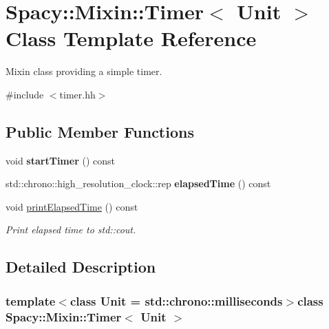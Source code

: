 \hypertarget{classSpacy_1_1Mixin_1_1Timer}{\section{\-Spacy\-:\-:\-Mixin\-:\-:\-Timer$<$ \-Unit $>$ \-Class \-Template \-Reference}
\label{classSpacy_1_1Mixin_1_1Timer}
}


\-Mixin class providing a simple timer.  




{\ttfamily \#include $<$timer.\-hh$>$}

\subsection*{\-Public \-Member \-Functions}
\begin{DoxyCompactItemize}
\item 
\hypertarget{classSpacy_1_1Mixin_1_1Timer_acf3c292b6d482c7c4ded5f961be4bc4b}{void {\bfseries start\-Timer} () const }\label{classSpacy_1_1Mixin_1_1Timer_acf3c292b6d482c7c4ded5f961be4bc4b}

\item 
\hypertarget{classSpacy_1_1Mixin_1_1Timer_ab27a20d8e1e9bc90ea56cb18ff752798}{std\-::chrono\-::high\-\_\-resolution\-\_\-clock\-::rep {\bfseries elapsed\-Time} () const }\label{classSpacy_1_1Mixin_1_1Timer_ab27a20d8e1e9bc90ea56cb18ff752798}

\item 
\hypertarget{classSpacy_1_1Mixin_1_1Timer_a3b79b35213702118d0823f6040d5a315}{void \hyperlink{classSpacy_1_1Mixin_1_1Timer_a3b79b35213702118d0823f6040d5a315}{print\-Elapsed\-Time} () const }\label{classSpacy_1_1Mixin_1_1Timer_a3b79b35213702118d0823f6040d5a315}

\begin{DoxyCompactList}\small\item\em \-Print elapsed time to std\-::cout. \end{DoxyCompactList}\end{DoxyCompactItemize}


\subsection{\-Detailed \-Description}
\subsubsection*{template$<$class \-Unit = std\-::chrono\-::milliseconds$>$class Spacy\-::\-Mixin\-::\-Timer$<$ Unit $>$}

